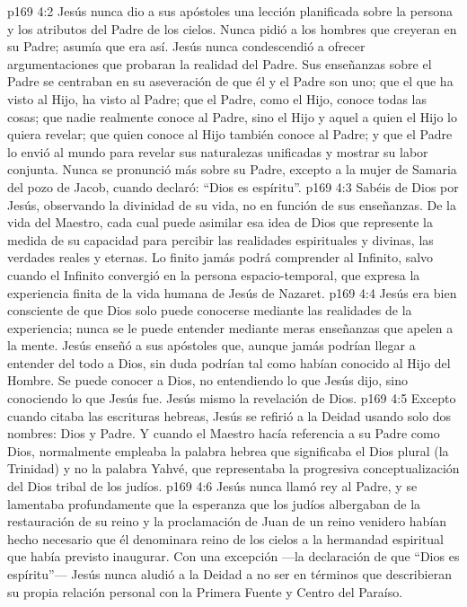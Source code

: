 \vs p169 4:2 Jesús nunca dio a sus apóstoles una lección planificada sobre la persona y los atributos del Padre de los cielos. Nunca pidió a los hombres que creyeran en su Padre; asumía que era así. Jesús nunca condescendió a ofrecer argumentaciones que probaran la realidad del Padre. Sus enseñanzas sobre el Padre se centraban en su aseveración de que él y el Padre son uno; que el que ha visto al Hijo, ha visto al Padre; que el Padre, como el Hijo, conoce todas las cosas; que nadie realmente conoce al Padre, sino el Hijo y aquel a quien el Hijo lo quiera revelar; que quien conoce al Hijo también conoce al Padre; y que el Padre lo envió al mundo para revelar sus naturalezas unificadas y mostrar su labor conjunta. Nunca se pronunció más sobre su Padre, excepto a la mujer de Samaria del pozo de Jacob, cuando declaró: “Dios es espíritu”.
\vs p169 4:3 \pc Sabéis de Dios por Jesús, observando la divinidad de su vida, no en función de sus enseñanzas. De la vida del Maestro, cada cual puede asimilar esa idea de Dios que represente la medida de su capacidad para percibir las realidades espirituales y divinas, las verdades reales y eternas. Lo finito jamás podrá comprender al Infinito, salvo cuando el Infinito convergió en la persona espacio\hyp{}temporal, que expresa la experiencia finita de la vida humana de Jesús de Nazaret.
\vs p169 4:4 Jesús era bien consciente de que Dios solo puede conocerse mediante las realidades de la experiencia; nunca se le puede entender mediante meras enseñanzas que apelen a la mente. Jesús enseñó a sus apóstoles que, aunque jamás podrían llegar a entender del todo a Dios, sin duda podrían  tal como habían conocido al Hijo del Hombre. Se puede conocer a Dios, no entendiendo lo que Jesús dijo, sino conociendo lo que Jesús fue. Jesús mismo  la revelación de Dios.
\vs p169 4:5 \pc Excepto cuando citaba las escrituras hebreas, Jesús se refirió a la Deidad usando solo dos nombres: Dios y Padre. Y cuando el Maestro hacía referencia a su Padre como Dios, normalmente empleaba la palabra hebrea que significaba el Dios plural (la Trinidad) y no la palabra Yahvé, que representaba la progresiva conceptualización del Dios tribal de los judíos.
\vs p169 4:6 Jesús nunca llamó rey al Padre, y se lamentaba profundamente que la esperanza que los judíos albergaban de la restauración de su reino y la proclamación de Juan de un reino venidero habían hecho necesario que él denominara reino de los cielos a la hermandad espiritual que había previsto inaugurar. Con una excepción ---la declaración de que “Dios es espíritu”--- Jesús nunca aludió a la Deidad a no ser en términos que describieran su propia relación personal con la Primera Fuente y Centro del Paraíso.
